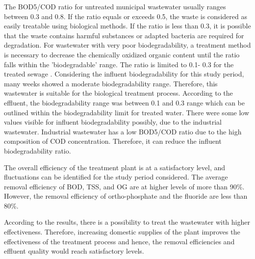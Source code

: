 The \ac{BOD5}/\ac{COD} ratio for untreated municipal wastewater usually ranges between 0.3 and 0.8. If the ratio equals or exceeds 0.5, the waste is considered as easily treatable using biological methods. If the ratio is less than 0.3, it is possible that the waste contains harmful substances or adapted bacteria are required for degradation. For wastewater with very poor biodegradability, a treatment method is necessary to decrease the chemically oxidized organic content until the ratio falls within the 'biodegradable' range. The ratio is limited to 0.1- 0.3 for the treated sewage \cite{AbdulRazzak2013}. Considering the influent biodegradability for this study period, many weeks showed a moderate biodegradability range. Therefore, this wastewater is suitable for the biological treatment process. According to the effluent, the biodegradability range was between 0.1 and 0.3 range which can be outlined within the biodegradability limit for treated water. There were some low values visible for influent biodegradability possibly, due to the industrial wastewater. Industrial wastewater has a low \ac{BOD5}/\ac{COD} ratio due to the high composition of \ac{COD} concentration. Therefore, it can reduce the influent biodegradability ratio. 

The overall efficiency of the treatment plant is at a satisfactory level, and fluctuations can be identified for the study period considered. The average removal efficiency of \ac{BOD}, \ac{TSS}, and \ac{OG} are at higher levels of more than 90\%. However, the removal efficiency of ortho-phosphate and the fluoride are less than 80\%. 

According to the results, there is a possibility to treat the wastewater with higher effectiveness. Therefore, increasing domestic supplies of the plant improves the effectiveness of the treatment process and hence, the removal efficiencies and effluent quality would reach satisfactory levels.



